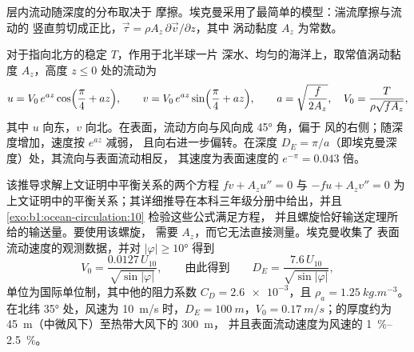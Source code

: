 层内流动随深度的分布取决于
摩擦。埃克曼采用了最简单的模型：湍流摩擦与流动的
竖直剪切成正比，$\vec\tau = \rho A_z\,\partial\vec v/\partial z$，其中
涡动黏度 $A_z$ 为常数。

\begin{proposition}[埃克曼螺旋]\label{prop:b1:ocean-circulation:spiral}
对于指向北方的稳定 $T$，作用于北半球一片
深水、均匀的海洋上，取常值涡动黏度 $A_z$，高度 $z
\leq 0$ 处的流动为
\[
  u = V_0\,e^{az}\cos\Bigl(\frac\pi4 + az\Bigr),\qquad
  v = V_0\,e^{az}\sin\Bigl(\frac\pi4 + az\Bigr),\qquad
  a = \sqrt{\frac{f}{2A_z}},\quad V_0 = \frac{T}{\rho\sqrt{fA_z}},
\]
其中 $u$ 向东，$v$ 向北。在表面，流动方向与风向成 \ang{45} 角，偏于
风的右侧；随深度增加，速度按 $e^{az}$ 减弱，
且向右进一步偏转。在深度 $D_E = \pi/a$（即埃克曼深度）处，其流向与表面流动相反，
其速度为表面速度的 $e^{-\pi} = \num{0.043}$ 倍。
\end{proposition}
\admitted

该推导求解上文证明中平衡关系的两个方程 $f v + A_z u'' = 0$ 与 $-f u + A_z v'' =
0$ 为上文证明中的平衡关系；其详细推导在本科三年级分册中给出，并且
\cref{exo:b1:ocean-circulation:10} 检验这些公式满足方程，
并且螺旋恰好输送定理所给的输送量。要使用该螺旋，
需要 $A_z$，而它无法直接测量。埃克曼收集了
表面流动速度的观测数据，并对 $|\varphi| \geq \ang{10}$ 得到
\[
  V_0 = \frac{0.0127\,U_{10}}{\sqrt{\sin|\varphi|}},
  \qquad\text{由此得到}\qquad
  D_E = \frac{7.6\,U_{10}}{\sqrt{\sin|\varphi|}},
\]
单位为国际单位制，其中他的阻力系数 $C_D = \num{2.6e-3}$，且 $\rho_a =
\qty{1.25}{kg.m^{-3}}$。在北纬 \ang{35} 处，风速为 \qty{10}{m/s} 时，$D_E =
\qty{100}{m}$，$V_0 = \qty{0.17}{m/s}$；的厚度约为
\qty{45}{m}（中微风下）至热带大风下的 \qty{300}{m}，
并且表面流动速度为风速的 \qtyrange{1}{2.5}{\percent}。

